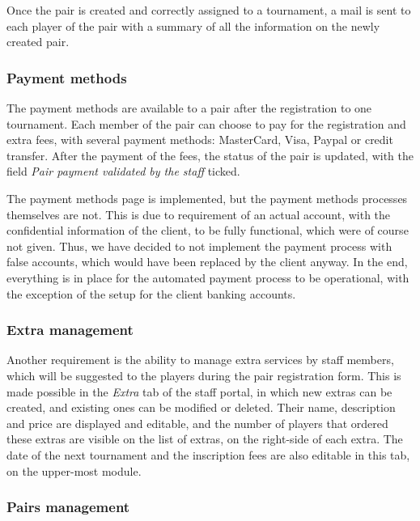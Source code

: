Once the pair is created and correctly assigned to a tournament, a mail
is sent to each player of the pair with a summary of all the information on the
newly created pair.

\subsubsection{Payment methods}
\label{subs:Payment methods}

The payment methods are available to a pair after the registration to one
tournament. Each member of the pair can choose to pay for the registration and
extra fees, with several payment methods: MasterCard, Visa, Paypal or credit
transfer. After the payment of the fees, the status of the pair is updated,
with the field \textit{Pair payment validated by the staff} ticked.\newline

The payment methods page is implemented, but the payment methods processes
themselves are not. This is due to requirement of an actual account,
with the confidential information of the client, to be fully functional,
which were of course not given. Thus, we have decided to not implement
the payment process with false accounts, which would have been replaced
by the client anyway. In the end, everything is in place for the automated
payment process to be operational, with the exception of the setup for the
client banking accounts.

\subsubsection{Extra management}
\label{subs:Extra management}

Another requirement is the ability to manage extra services by staff members,
which will be suggested to the players during the pair registration form.
This is made possible in the \textit{Extra} tab of the staff portal, in which
new extras can be created, and existing ones can be modified or deleted.
Their name, description and price are displayed and editable,
and the number of players that ordered these extras are visible on the list
of extras, on the right-side of each extra. The date of the next tournament
and the inscription fees are also editable in this tab,
on the upper-most module.

\subsubsection{Pairs management}
\label{subs:Pairs management}

